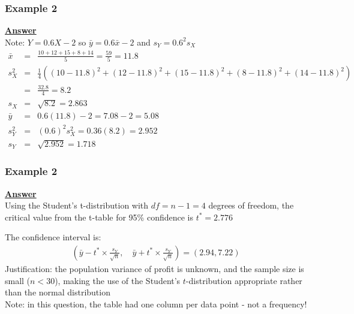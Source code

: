 \documentclass[t,8pt]{beamer}%
\begin{document}
\begin{frame}
	\frametitle{Example 2}
    {\bf\underline{Answer}} \\
    Note: \( Y = 0.6X - 2 \) so $\bar y=0.6\bar x-2$ and \( s_Y = 0.6^2 s_X \)
    \begin{eqnarray*}
        \bar{x} &=& \frac{10 + 12 + 15 + 8 + 14}{5} = \frac{59}{5} = 11.8 \\
        s_X^2 &=& \frac 14((10 - 11.8)^2 + (12 - 11.8)^2 + (15 - 11.8)^2 + (8 - 11.8)^2 + (14 - 11.8)^2) \\
        &=& \frac{32.8}{4} = 8.2 \\
        s_X &=& \sqrt{8.2} = 2.863 \\
        \bar{y} &=& 0.6(11.8) - 2 = 7.08 - 2 = 5.08 \\
        s_Y^2 &=& (0.6)^2 s_X^2 = 0.36(8.2) = 2.952 \\
        s_Y &=& \sqrt{2.952} = 1.718
    \end{eqnarray*}
\end{frame}

\begin{frame}
	\frametitle{Example 2}
    {\bf\underline{Answer}} \\
    Using the Student's t-distribution with \( df = n-1 = 4 \) degrees of freedom, the critical value from the t-table for 95\% confidence is \( t^* = 2.776 \) \par
    The confidence interval is:
    \begin{eqnarray*}
        \left(\bar{y}-t^*\times\frac{s_Y}{\sqrt{n}},\quad \bar{y}+t^*\times\frac{s_Y}{\sqrt{n}}\right)=(2.94, 7.22)
    \end{eqnarray*}
    Justification: the population variance of profit is unknown, and the sample size is small (\( n < 30 \)), making the use of the Student’s $t$-distribution appropriate rather than the normal distribution \\
    Note: in this question, the table had one column per data point - not a frequency!
\end{frame}
\end{document}
